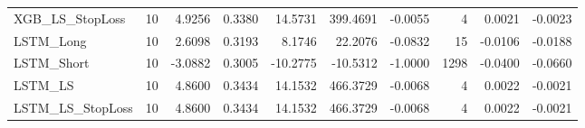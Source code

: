 \begin{tabular}{llrrrrrrrr}
\cline{1-10}
XGB\_LS\_StopLoss & 10 & 4.9256 & 0.3380 & 14.5731 & 399.4691 & -0.0055 & 4 & 0.0021 & -0.0023 \\
\cline{1-10}
LSTM\_Long & 10 & 2.6098 & 0.3193 & 8.1746 & 22.2076 & -0.0832 & 15 & -0.0106 & -0.0188 \\
\cline{1-10}
LSTM\_Short & 10 & -3.0882 & 0.3005 & -10.2775 & -10.5312 & -1.0000 & 1298 & -0.0400 & -0.0660 \\
\cline{1-10}
LSTM\_LS & 10 & 4.8600 & 0.3434 & 14.1532 & 466.3729 & -0.0068 & 4 & 0.0022 & -0.0021 \\
\cline{1-10}
LSTM\_LS\_StopLoss & 10 & 4.8600 & 0.3434 & 14.1532 & 466.3729 & -0.0068 & 4 & 0.0022 & -0.0021 \\
\cline{1-10}
\bottomrule
\end{tabular}
